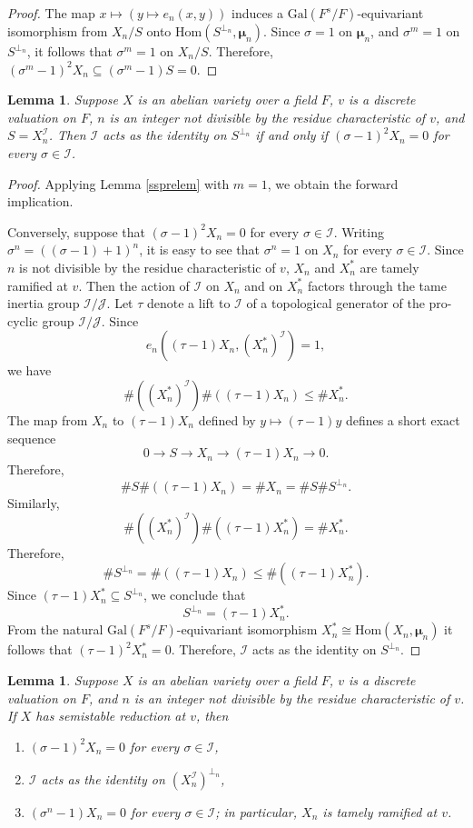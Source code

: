 \documentclass{amsart}
\def\Gal{\mathrm{Gal}}
\def\Hom{\mathrm{Hom}}
\def\I{{\mathcal I}}
\def\J{{\mathcal J}}
\def\bmu{\boldsymbol \mu}
\newtheorem{lem}[thm]{Lemma}
\theoremstyle{definition}
\begin{document}
\begin{proof}
The map $x \mapsto (y \mapsto e_n(x,y))$ induces a
$\Gal(F^s/F)$-equivariant isomorphism from $X_n/S$ onto
$\Hom(S^{\perp_n},\bmu_n)$. Since  
$\sigma = 1$ on $\bmu_n$, and 
$\sigma^m = 1$ on $S^{\perp_n}$, it follows that $\sigma^m = 1$ on $X_n/S$. 
Therefore, 
$(\sigma^m-1)^2X_n \subseteq (\sigma^m-1)S = 0$.
\end{proof}

\begin{lem}
\label{sslem}
Suppose $X$ is an abelian variety over a field $F$, $v$ is a discrete 
valuation on $F$, $n$ is an integer not 
divisible by the residue characteristic of $v$,  
and $S = X_n^\I$.  
Then $\I$ acts as the identity on $S^{\perp_n}$
if and only if 
$(\sigma-1)^2 X_n = 0$ for every $\sigma \in \I$.
\end{lem}

\begin{proof}
Applying Lemma \ref{ssprelem} with $m = 1$, we obtain the
forward implication. 

Conversely, suppose that
$(\sigma-1)^2 X_n = 0$ for every $\sigma \in \I$. Writing
$\sigma^n = ((\sigma-1)+1)^n$, it is easy to see that 
$\sigma^n = 1$ on $X_n$ for every $\sigma \in \I$. 
Since $n$ is not divisible by the residue characteristic of $v$, 
$X_n$ and $X_n^\ast$ are tamely ramified at $v$.
Then the action of $\I$ on $X_n$ and on $X_n^\ast$ factors through 
the tame inertia group $\I/\J$. 
Let $\tau$ denote
a lift to $\I$ of a topological generator of the pro-cyclic group
$\I/\J$. Since 
$$e_n((\tau-1)X_n,(X_n^\ast)^\I) = 1,$$
we have 
$$\#((X_n^\ast)^\I)\#((\tau-1)X_n) \le \#X_n^\ast.$$
The map from $X_n$ to $(\tau-1)X_n$ defined by
$y \mapsto (\tau-1)y$ defines a short exact sequence
$$0 \to S \to X_n \to (\tau-1)X_n \to 0.$$
Therefore, 
$$\#S\#((\tau-1)X_n) = \#X_n = \#S\#S^{\perp_n}.$$
Similarly, 
$$\#((X_n^\ast)^\I)\#((\tau-1)X_n^\ast) = \#X_n^\ast.$$
Therefore, 
$$\#S^{\perp_n} = \#((\tau-1)X_n) \le \#((\tau-1)X_n^\ast).$$
Since $(\tau-1)X_n^\ast \subseteq S^{\perp_n}$,
we conclude that 
$$S^{\perp_n} = (\tau-1)X_n^\ast.$$ From the natural
$\Gal(F^s/F)$-equivariant isomorphism 
$X_n^\ast \cong \Hom(X_n,\bmu_n)$ it follows
that $(\tau-1)^2X_n^\ast = 0$.
Therefore, $\I$ acts as the identity on $S^{\perp_n}$.
\end{proof}

\begin{lem}
\label{sslem2}
Suppose $X$ is an abelian variety over a field $F$, $v$ is a discrete 
valuation on $F$, and $n$ is an integer not 
divisible by the residue characteristic of $v$. 
If $X$ has semistable reduction at $v$, then
\begin{enumerate}
\item[(i)] $(\sigma-1)^2X_n = 0$ for every $\sigma \in \I$,
\item[(ii)] $\I$ acts as the identity on $(X_n^\I)^{\perp_n}$,
\item[(iii)] $(\sigma^n-1)X_n = 0$ for every $\sigma \in \I$;
in particular, $X_n$ is tamely ramified at $v$.
\end{enumerate}
\end{lem}
\end{document}
